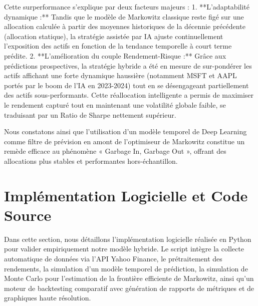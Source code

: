 Cette surperformance s'explique par deux facteurs majeurs :
1. **L'adaptabilité dynamique :** Tandis que le modèle de Markowitz classique reste figé sur une allocation calculée à partir des moyennes historiques de la décennie précédente (allocation statique), la stratégie assistée par IA ajuste continuellement l'exposition des actifs en fonction de la tendance temporelle à court terme prédite.
2. **L'amélioration du couple Rendement-Risque :** Grâce aux prédictions prospectives, la stratégie hybride a été en mesure de sur-pondérer les actifs affichant une forte dynamique haussière (notamment MSFT et AAPL portés par le boom de l'IA en 2023-2024) tout en se désengageant partiellement des actifs sous-performants. Cette réallocation intelligente a permis de maximiser le rendement capturé tout en maintenant une volatilité globale faible, se traduisant par un Ratio de Sharpe nettement supérieur.

Nous constatons ainsi que l'utilisation d'un modèle temporel de Deep Learning comme filtre de prévision en amont de l'optimiseur de Markowitz constitue un remède efficace au phénomène « Garbage In, Garbage Out », offrant des allocations plus stables et performantes hors-échantillon.

\section{Implémentation Logicielle et Code Source}
Dans cette section, nous détaillons l'implémentation logicielle réalisée en Python pour valider empiriquement notre modèle hybride. Le script intègre la collecte automatique de données via l'API Yahoo Finance, le prétraitement des rendements, la simulation d'un modèle temporel de prédiction, la simulation de Monte Carlo pour l'estimation de la frontière efficiente de Markowitz, ainsi qu'un moteur de backtesting comparatif avec génération de rapports de métriques et de graphiques haute résolution.

